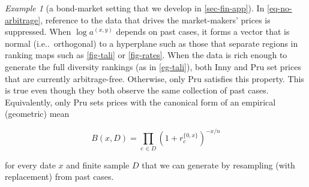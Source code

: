 \documentclass[ecta,nameyear,draft]{econsocart}
\makeatletter
\newcommand{\xy}{{(x, y)}}
\newcommand\ie{i\@.e\@ifnextchar.{}{.\@}}
\theoremstyle{plain}
\theoremstyle{remark}
\newtheorem{example}{Example}%
\makeatother
\begin{document}
\begin{example}[a bond-market setting that we develop in \cref{sec-fin-app}]
  In \cref{eq-no-arbitrage}, reference to the data that drives the
  market-makers' prices is suppressed. When $\log a^\xy$ depends on past cases,
  it forms a vector that is normal (\ie\ orthogonal) to a hyperplane such as
  those that separate regions in ranking maps such as \cref{fig-tali} or
  \cref{fig-rates}.  When the data is rich enough to generate the full
  diversity rankings (as in \cref{eg-tali}), both Inny and {Pru} set prices
  that are currently arbitrage-free.  Otherwise, only {Pru} satisfies this
  property. This is true even though they both observe the same collection of
  past cases.  Equivalently, only {Pru} sets prices with the canonical form of
  an empirical (geometric) mean
  \begin{linenomath*}
    \begin{equation} B(x, D) = \prod_{c\, \in
      D}\left( 1 + r^{\{0,x\}}_{c} \right)^{-{x}/{n}}
    \end{equation}
  \end{linenomath*}
  for every date $x$ and finite sample $D$ that we can generate by resampling
  (with replacement) from past cases.
\end{example}
\end{document}
